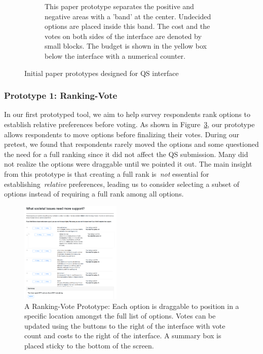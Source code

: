 \begin{figure}[H]
\begin{subfigure}[b]{0.42\textwidth}
        \caption{This paper prototype separates the positive and negative areas with a 'band' at the center. Undecided options are placed inside this band. The cost and the votes on both sides of the interface are denoted by small blocks. The budget is shown in the yellow box below the interface with a numerical counter.}
        \label{fig:vertical_paper}
    \end{subfigure}
    \caption{Initial paper prototypes designed for QS interface}
    \label{fig:qv_paper}
\end{figure}

\subsubsection{Prototype 1: Ranking-Vote}
In our first prototyped tool, we aim to help survey respondents rank options to establish relative preferences before voting. As shown in Figure~\ref{fig:qv_rank}, our prototype allows respondents to move options before finalizing their votes. During our pretest, we found that respondents rarely moved the options and some questioned the need for a full ranking since it did not affect the QS submission. Many did not realize the options were draggable until we pointed it out. The main insight from this prototype is that creating a full rank is~\textit{not} essential for establishing~\textit{relative} preferences, leading us to consider selecting a subset of options instead of requiring a full rank among all options.

\begin{figure}[h]
    \centering
    \includegraphics[width=0.43\textwidth]{content/image/prototypes/2_ranking.png}
    \caption{A Ranking-Vote Prototype: Each option is draggable to position in a specific location amongst the full list of options. Votes can be updated using the buttons to the right of the interface with vote count and costs to the right of the interface. A summary box is placed sticky to the bottom of the screen.}
    \label{fig:qv_rank}
\end{figure}

